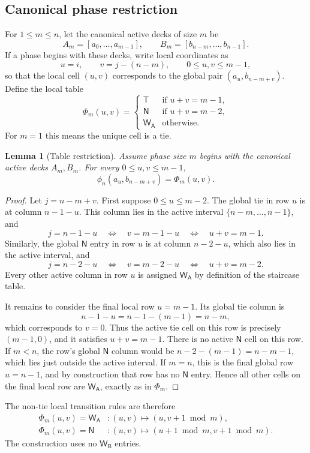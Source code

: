 \documentclass[11pt]{article}
\newtheorem{lemma}{Lemma}
\theoremstyle{definition}
\theoremstyle{remark}
\newcommand{\WA}{\mathsf{W_A}}
\newcommand{\WB}{\mathsf{W_B}}
\newcommand{\TT}{\mathsf{T}}
\newcommand{\NN}{\mathsf{N}}
\begin{document}
\subsection{Canonical phase restriction}
For $1\le m\le n$, let the canonical active decks of size $m$ be
\[
A_m=[a_0,\dots,a_{m-1}],\qquad B_m=[b_{n-m},\dots,b_{n-1}].
\]
If a phase begins with these decks, write local coordinates as
\[
u=i,
\qquad
v=j-(n-m),
\qquad 0\le u,v\le m-1,
\]
so that the local cell $(u,v)$ corresponds to the global pair $(a_u,b_{n-m+v})$. Define the local table
\[
\Phi_m(u,v)=
\begin{cases}
\TT & \text{if } u+v=m-1, \\
\NN & \text{if } u+v=m-2, \\
\WA & \text{otherwise}.
\end{cases}
\]
For $m=1$ this means the unique cell is a tie.

\begin{lemma}[Table restriction]\label{lem:restrict}
Assume phase size $m$ begins with the canonical active decks $A_m,B_m$. For every $0\le u,v\le m-1$,
\[
\phi_n(a_u,b_{n-m+v})=\Phi_m(u,v).
\]
\end{lemma}
\begin{proof}
Let $j=n-m+v$. First suppose $0\le u\le m-2$. The global tie in row $u$ is at column $n-1-u$. This column lies in the active interval $\{n-m,\dots,n-1\}$, and
\[
j=n-1-u \quad\Longleftrightarrow\quad v=m-1-u \quad\Longleftrightarrow\quad u+v=m-1.
\]
Similarly, the global $\NN$ entry in row $u$ is at column $n-2-u$, which also lies in the active interval, and
\[
j=n-2-u \quad\Longleftrightarrow\quad v=m-2-u \quad\Longleftrightarrow\quad u+v=m-2.
\]
Every other active column in row $u$ is assigned $\WA$ by definition of the staircase table.

It remains to consider the final local row $u=m-1$. Its global tie column is
\[
n-1-u=n-1-(m-1)=n-m,
\]
which corresponds to $v=0$. Thus the active tie cell on this row is precisely $(m-1,0)$, and it satisfies $u+v=m-1$. There is no active $\NN$ cell on this row. If $m<n$, the row's global $\NN$ column would be $n-2-(m-1)=n-m-1$, which lies just outside the active interval. If $m=n$, this is the final global row $u=n-1$, and by construction that row has no $\NN$ entry. Hence all other cells on the final local row are $\WA$, exactly as in $\Phi_m$.
\end{proof}

The non-tie local transition rules are therefore
\begin{align*}
\Phi_m(u,v)=\WA &: (u,v)\mapsto (u,v+1\bmod m),\\
\Phi_m(u,v)=\NN &: (u,v)\mapsto (u+1\bmod m,v+1\bmod m).
\end{align*}
The construction uses no $\WB$ entries.
\end{document}
